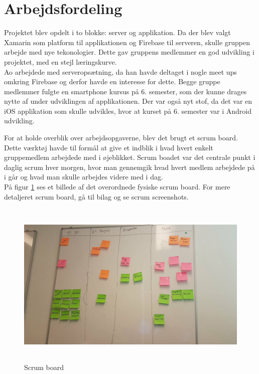 \section{Arbejdsfordeling}
Projektet blev opdelt i to blokke: server og applikation. Da der blev valgt Xamarin som platform til applikationen og Firebase til serveren, skulle gruppen arbejde med nye tekonologier. Dette gav gruppens medlemmer en god udvikling i projektet, med en stejl læringskurve.\\

Ao arbejdede med serveropsætning, da han havde deltaget i nogle meet ups omkring Firebase og derfor havde en interesse for dette. Begge gruppe medlemmer fulgte en smartphone kursus på 6. semester, som der kunne drages nytte af under udviklingen af applikationen. Der var også nyt stof, da det var en iOS applikation som skulle udvikles, hvor at kurset på 6. semester var i Android udvikling. \\

\clearpage

For at holde overblik over arbejdsopgaverne, blev det brugt et scrum board. Dette værktøj havde til formål at give et indblik i hvad hvert enkelt gruppemedlem arbejdede med i øjeblikket. Scrum boadet var det centrale punkt i daglig scrum hver morgen, hvor man gennemgik hvad hvert medlem arbejdede på i går og hvad man skulle arbejdes videre med i dag. \\
På figur \ref{fig:Scrumboard} ses et billede af det overordnede fysiske scrum board. For mere detaljeret scrum board, gå til bilag og se scrum screenshots. \\

\begin{figure} [H]
	\begin{center}
		\includegraphics[height=8cm, width=12cm]{Arbejdsfordeling/ScrumBoard}
	\end{center}
	\caption{Scrum board}
	\label{fig:Scrumboard}
\end{figure}


\clearpage